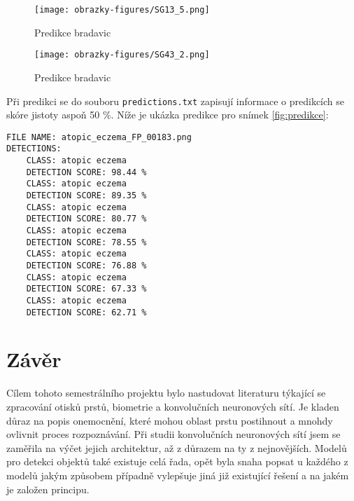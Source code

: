 \begin{figure}[!htbp]
  \begin{minipage}[b]{0.5\linewidth}
    \centering
    \texttt{[image: obrazky-figures/SG13\_5.png]}
    \caption{Predikce bradavic}
  \end{minipage}
  \hspace{0.5cm}
  \begin{minipage}[b]{0.5\linewidth}
    \centering
    \texttt{[image: obrazky-figures/SG43\_2.png]}
    \caption{Predikce bradavic}
  \end{minipage}
\end{figure}

Při predikci se do souboru \verb=predictions.txt= zapisují informace o predikcích se skóre jistoty aspoň 50 \%. Níže je ukázka predikce pro snímek \ref{fig:predikce}:
\begin{verbatim}
FILE NAME: atopic_eczema_FP_00183.png
DETECTIONS: 
	CLASS: atopic eczema
	DETECTION SCORE: 98.44 %
	CLASS: atopic eczema
	DETECTION SCORE: 89.35 %
	CLASS: atopic eczema
	DETECTION SCORE: 80.77 %
	CLASS: atopic eczema
	DETECTION SCORE: 78.55 %
	CLASS: atopic eczema
	DETECTION SCORE: 76.88 %
	CLASS: atopic eczema
	DETECTION SCORE: 67.33 %
	CLASS: atopic eczema
	DETECTION SCORE: 62.71 %
\end{verbatim}








\chapter{Závěr}
Cílem tohoto semestrálního projektu bylo nastudovat literaturu týkající se zpracování otisků prstů, biometrie a konvolučních neuronových sítí. Je kladen důraz na popis onemocnění, které mohou oblast prstu postihnout a mnohdy ovlivnit proces rozpoznávání. Při studii konvolučních neuronových sítí jsem se zaměřila na výčet jejich architektur, až z důrazem na ty z nejnovějších. Modelů pro detekci objektů také existuje celá řada, opět byla snaha popsat u každého z modelů jakým způsobem případně vylepšuje jiná již existující řešení a na jakém je založen principu.

